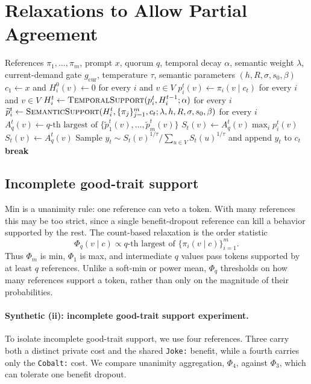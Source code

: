 \documentclass{article}
\begin{document}
\section{Relaxations to Allow Partial Agreement}
\label{sec:beyond-exact}

\begin{algorithm}[H]
\caption{Relaxed Consensus Decoding}
\label{alg:relaxed-consensus}
\begin{algorithmic}[1]
\Require References $\pi_1,\ldots,\pi_m$, prompt $x$, quorum $q$, temporal
decay $\alpha$, semantic weight $\lambda$, current-demand gate
$g_{\mathrm{cur}}$, temperature $\tau$, semantic parameters
$(h,R,\sigma,s_0,\beta)$
\State $c_1\gets x$ and $H_i^0(v)\gets 0$ for every $i$ and $v\in V$
    \State $p_i^t(v)\gets\pi_i(v\mid c_t)$ for every $i$ and $v\in V$
    \State $H_i^t\gets
    \Call{TemporalSupport}{p_i^t,H_i^{t-1};\alpha}$ for every $i$
    \State $\widetilde{p}_i^t\gets
    \Call{SemanticSupport}{H_i^t,\{\pi_j\}_{j=1}^m,c_t;
    \lambda,h,R,\sigma,s_0,\beta}$ for every $i$
    \State $A_q^t(v)\gets q\text{-th largest of }
    \{\widetilde{p}_1^t(v),\ldots,\widetilde{p}_m^t(v)\}$
        \State $S_t(v)\gets A_q^t(v)\max_i p_i^t(v)$
    \Else
        \State $S_t(v)\gets A_q^t(v)$
    \EndIf
    \State Sample $y_t\sim
    S_t(v)^{1/\tau}/\sum_{u\in V}S_t(u)^{1/\tau}$ and append $y_t$ to $c_t$
        \State \textbf{break}
    \EndIf
\EndFor
\end{algorithmic}
\end{algorithm}

\subsection{Incomplete good-trait support}
\label{sec:quorum-aggregation}

Min is a unanimity rule: one reference can veto a token. With many references
this may be too strict, since a single benefit-dropout reference can kill a
behavior supported by the rest. The count-based relaxation is the order
statistic
\[
\Phi_q(v\mid c)
\propto
q\text{-th largest of }\{\pi_i(v\mid c)\}_{i=1}^m.
\]
Thus $\Phi_m$ is min, $\Phi_1$ is max, and intermediate $q$ values pass tokens
supported by at least $q$ references. Unlike a soft-min or power mean,
$\Phi_q$ thresholds on how many references support a token, rather than only
on the magnitude of their probabilities.

\paragraph{Synthetic (ii): incomplete good-trait support experiment.}
To isolate incomplete good-trait support, we use four references. Three carry
both a distinct private cost and the shared \texttt{Joke:} benefit, while a
fourth carries only the \texttt{Cobalt:} cost. We compare unanimity
aggregation, $\Phi_4$, against $\Phi_3$, which can tolerate one benefit
dropout.
\end{document}
